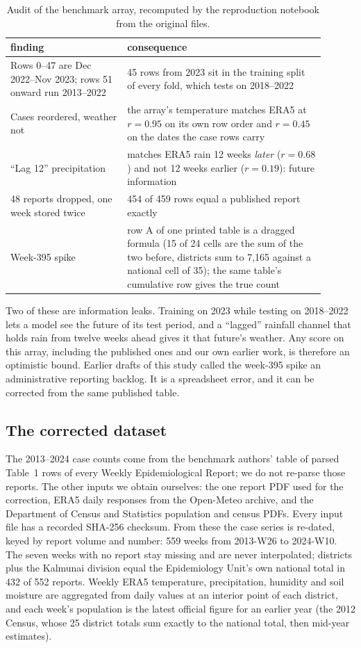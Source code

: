 \begin{table}[t]
\centering
\caption{Audit of the benchmark array, recomputed by the reproduction notebook
from the original files.}
\label{tab:audit}
\small
\setlength{\tabcolsep}{3pt}
\begin{tabular}{p{0.33\linewidth}p{0.57\linewidth}}
\toprule
finding & consequence \\
\midrule
Rows 0--47 are Dec 2022--Nov 2023; rows 51 onward run 2013--2022 & 45 rows from 2023 sit in
the training split of every fold, which tests on 2018--2022 \\
Cases reordered, weather not & the array's temperature matches ERA5 at
$r = 0.95$ on its own row order and $r = 0.45$ on the dates the case rows carry \\
``Lag 12'' precipitation & matches ERA5 rain 12 weeks \emph{later}
($r = 0.68$) and not 12 weeks earlier ($r = 0.19$): future information \\
48 reports dropped, one week stored twice & 454 of 459 rows equal a published
report exactly \\
Week-395 spike & row A of one printed table is a dragged formula
(15 of 24 cells are the sum of the two before, districts sum to 7,165 against a
national cell of 35); the same table's cumulative row gives the true count \\
\bottomrule
\end{tabular}
\end{table}

Two of these are information leaks. Training on 2023 while testing on
2018--2022 lets a model see the future of its test period, and a ``lagged''
rainfall channel that holds rain from twelve weeks ahead gives it that future's
weather. Any score on this array, including the published ones and our own
earlier work, is therefore an optimistic bound. Earlier drafts of this study
called the week-395 spike an administrative reporting backlog. It is a
spreadsheet error, and it can be corrected from the same published table.

\subsection{The corrected dataset}
\label{sec:corrected}
The 2013--2024 case counts come from the benchmark authors' table of parsed
Table~1 rows of every Weekly Epidemiological Report; we do not re-parse those
reports. The other inputs we obtain ourselves: the one report PDF used for the
correction, ERA5 daily responses from the Open-Meteo archive, and the Department
of Census and Statistics population and census PDFs. Every input file has a
recorded SHA-256 checksum. From these the case series is re-dated, keyed by report volume
and number: 559 weeks from 2013-W26 to 2024-W10. The seven weeks with no report
stay missing and are never interpolated; districts plus the Kalmunai division
equal the Epidemiology Unit's own national total in 432 of 552 reports. Weekly
ERA5 temperature, precipitation, humidity and soil moisture are aggregated from
daily values at an interior point of each district, and each week's population
is the latest official figure for an earlier year (the 2012 Census, whose 25
district totals sum exactly to the national total, then mid-year estimates).

